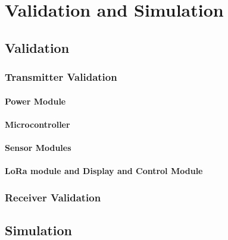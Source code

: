 \documentclass[class=report,11pt,crop=false]{standalone}
\begin{document}
\chapter{Validation and Simulation \label{ch:validationandsimulation}}


\cite{christian_wolff_physical_2024}
\section{Validation}

\subsection{Transmitter Validation}
\subsubsection{Power Module}

\subsubsection{Microcontroller}

\subsubsection{Sensor Modules}

\subsubsection{LoRa module and Display and Control Module}

\subsection{Receiver Validation}

\section{Simulation}


\ifstandalone

\printnoidxglossary[type=\acronymtype,nonumberlist]
\fi
\end{document}

